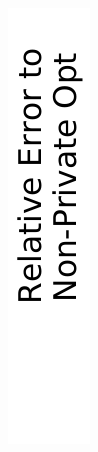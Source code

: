 \begin{figure}[t]
  \captionsetup[subfigure]{justification=centering}
  \centering
  \begin{subfigure}{0.048\linewidth}
    \centering
    \includegraphics[width=\linewidth]{plots/xlegend.pdf}

\end{subfigure}
\end{figure}
